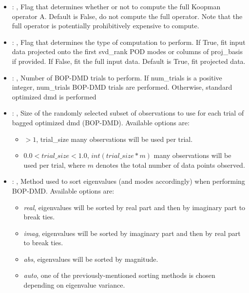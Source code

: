 \begin{itemize}
    \item {}: , 
      Flag that determines whether or not to compute the full Koopman operator A.
      Default is False, do not compute the full operator. Note that the full operator
      is potentially prohibitively expensive to compute.

    \item {}: , 
      Flag that determines the type of computation to perform. If True, fit input
      data projected onto the first svd\_rank POD modes or columns of proj\_basis if provided.
      If False, fit the full input data. Default is True, fit projected data.

    \item {}: , 
      Number of BOP-DMD trials to perform. If num\_trials is a positive integer,
      num\_trials BOP-DMD trials are performed. Otherwise, standard optimized dmd is performed

    \item {}: , 
      Size of the randomly selected subset of observations to use for each trial of bagged optimized
      dmd (BOP-DMD).                                                  Available options are:
      \begin{itemize}                                                    \item \textit{$>1$},
      trial\_size many observations will be used per trial.
      \item $0.0 < trial\_size < 1.0$, $int(trial\_size * m)$ many observations will be used per
      trial,                                                        where $m$ denotes the total
      number of data points observed.                                                  \end{itemize}

    \item {}: , 
      Method used to sort eigenvalues (and modes accordingly) when performing BOP-DMD. Available
      options are:                                                  \begin{itemize}
      \item \textit{real}, eigenvalues will be sorted by real part and then by imaginary part to
      break ties.                                                    \item  \textit{imag},
      eigenvalues will be sorted by imaginary part and then by real part to break ties.
      \item  \textit{abs}, eigenvalues will be sorted by magnitude.
      \item  \textit{auto}, one of the previously-mentioned sorting methods is chosen depending on
      eigenvalue variance.                                                  \end{itemize}


\end{itemize}
